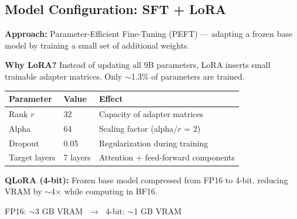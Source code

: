 \subsection{Model Configuration: SFT + LoRA}
\begin{frame}{\insertsubsection}
  \textbf{Approach:} Parameter-Efficient Fine-Tuning (PEFT) --- adapting a frozen
  base model by training a small set of additional weights.

  \vspace{0.1cm}
  \textbf{Why LoRA?} Instead of updating all 9B parameters, LoRA inserts small
  trainable adapter matrices. Only $\sim$1.3\% of parameters are trained.

  \vspace{0.1cm}
  \small
  \begin{tabular}{p{} p{} p{}}
    \textbf{Parameter}   & \textbf{Value} & \textbf{Effect}                     \\
    \hline
    Rank $r$             & 32             & Capacity of adapter matrices        \\
    Alpha                & 64             & Scaling factor (alpha/$r$ = 2)      \\
    Dropout              & 0.05           & Regularization during training      \\
    Target layers        & 7 layers       & Attention + feed-forward components \\
  \end{tabular}

  \vspace{0.15cm}
  \normalsize
  \textbf{QLoRA (4-bit):} Frozen base model compressed from FP16 to 4-bit,
  reducing VRAM by $\sim$4$\times$ while computing in BF16.

  \begin{center}
    \small
    FP16: $\sim$3 GB VRAM $\;\rightarrow\;$ 4-bit: $\sim$1 GB VRAM
  \end{center}
\end{frame}

